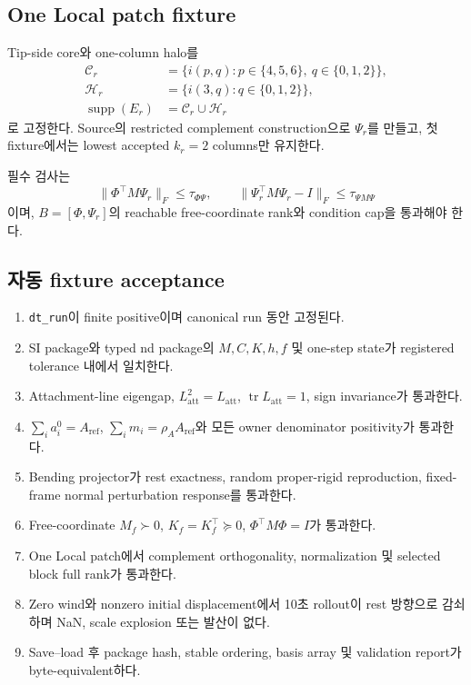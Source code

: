 \documentclass[11pt]{article}
\newcommand{\code}[1]{\texttt{\small #1}}
\begin{document}
\subsection{One Local patch fixture}

Tip-side core와 one-column halo를
\begin{align}
  \mathcal C_r
  &=\{i(p,q):p\in\{4,5,6\},\ q\in\{0,1,2\}\},\\
  \mathcal H_r
  &=\{i(3,q):q\in\{0,1,2\}\},\\
  \operatorname{supp}(E_r)
  &=\mathcal C_r\cup\mathcal H_r
\end{align}
로 고정한다. Source의 restricted complement construction으로 $\Psi_r$를 만들고,
첫 fixture에서는 lowest accepted $k_r=2$ columns만 유지한다.

필수 검사는
\begin{equation}
  \|\Phi^\top M\Psi_r\|_F\leq\tau_{\Phi\Psi},
  \qquad
  \|\Psi_r^\top M\Psi_r-I\|_F\leq\tau_{\Psi M\Psi}
\end{equation}
이며, $B=[\Phi,\Psi_r]$의 reachable free-coordinate rank와 condition cap을 통과해야 한다.

\subsection{자동 fixture acceptance}

\begin{enumerate}
  \item \code{dt\_run}이 finite positive이며 canonical run 동안 고정된다.
  \item SI package와 typed nd package의 $M,C,K,h,f$ 및 one-step state가 registered tolerance 내에서 일치한다.
  \item Attachment-line eigengap, $L_{\mathrm{att}}^2=L_{\mathrm{att}}$, $\operatorname{tr}L_{\mathrm{att}}=1$, sign invariance가 통과한다.
  \item $\sum_i a_i^0=A_{\mathrm{ref}}$, $\sum_i m_i=\rho_AA_{\mathrm{ref}}$와 모든 owner denominator positivity가 통과한다.
  \item Bending projector가 rest exactness, random proper-rigid reproduction, fixed-frame normal perturbation response를 통과한다.
  \item Free-coordinate $M_f\succ0$, $K_f=K_f^\top\succeq0$, $\Phi^\top M\Phi=I$가 통과한다.
  \item One Local patch에서 complement orthogonality, normalization 및 selected block full rank가 통과한다.
  \item Zero wind와 nonzero initial displacement에서 10초 rollout이 rest 방향으로 감쇠하며 NaN, scale explosion 또는 발산이 없다.
  \item Save--load 후 package hash, stable ordering, basis array 및 validation report가 byte-equivalent하다.
\end{enumerate}
\end{document}
